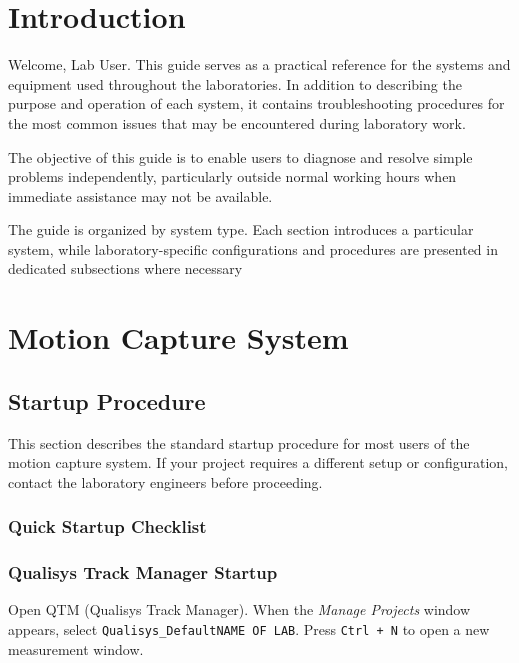 \documentclass[12pt,a4paper]{article}
\begin{document}
	\vspace*{\fill}
	
	\clearpage
	\tableofcontents
	\listoffigures
	\listoftables
	\section{Introduction}
	Welcome, Lab User.
	This guide serves as a practical reference for the systems and equipment used throughout the laboratories. In addition to describing the purpose and operation of each system, it contains troubleshooting procedures for the most common issues that may be encountered during laboratory work.
	
	The objective of this guide is to enable users to diagnose and resolve simple problems independently, particularly outside normal working hours when immediate assistance may not be available.
	
	The guide is organized by system type. Each section introduces a particular system, while laboratory-specific configurations and procedures are presented in dedicated subsections where necessary
	\section{Motion Capture System}
	\label{sec:mocap}
	
	\subsection{Startup Procedure}
	
	This section describes the standard startup procedure for most users of the motion capture system. If your project requires a different setup or configuration, contact the laboratory engineers before proceeding.
	
	\subsubsection{Quick Startup Checklist}
	
	
	\subsubsection{Qualisys Track Manager Startup}
	
	
	Open QTM (Qualisys Track Manager). When the \textit{Manage Projects} window appears, select \texttt{Qualisys\_Default\textlangle NAME OF LAB\textrangle}. Press \texttt{Ctrl + N} to open a new measurement window.
	
\end{document}

